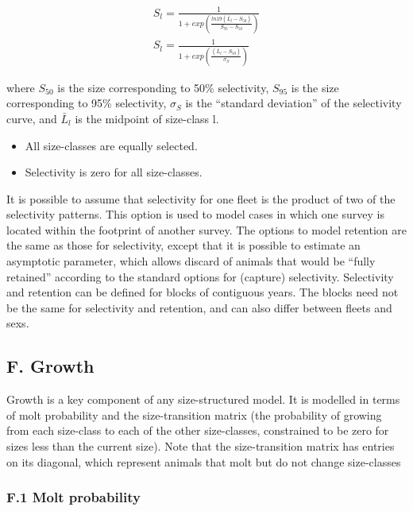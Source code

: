 \documentclass[]{article}
\providecommand{\tightlist}{%
  \setlength{\itemsep}{0pt}\setlength{\parskip}{0pt}}
\begin{document}
\begin{align}
   S_{l} = \frac {1} {1 + exp(\frac{ln19(\bar{L}_l - S_{50})}{S_{95}-S_{50}})} \\[2ex]
   S_{l} = \frac {1} {1 + exp(\frac{(\bar{L}_l - S_{50})}{\sigma_{S}})} 
  \end{align}

where \(S_{50}\) is the size corresponding to 50\% selectivity,
\(S_{95}\) is the size corresponding to 95\% selectivity, \(\sigma_{S}\)
is the ``standard deviation'' of the selectivity curve, and
\(\bar{L}_l\) is the midpoint of size-class l.

\begin{itemize}
\tightlist
\item
  All size-classes are equally selected.
\item
  Selectivity is zero for all size-classes.
\end{itemize}

It is possible to assume that selectivity for one fleet is the product
of two of the selectivity patterns. This option is used to model cases
in which one survey is located within the footprint of another survey.
The options to model retention are the same as those for selectivity,
except that it is possible to estimate an asymptotic parameter, which
allows discard of animals that would be ``fully retained'' according to
the standard options for (capture) selectivity. Selectivity and
retention can be defined for blocks of contiguous years. The blocks need
not be the same for selectivity and retention, and can also differ
between fleets and sexs.

\hypertarget{f.-growth}{%
\subsection{F. Growth}\label{f.-growth}}

Growth is a key component of any size-structured model. It is modelled
in terms of molt probability and the size-transition matrix (the
probability of growing from each size-class to each of the other
size-classes, constrained to be zero for sizes less than the current
size). Note that the size-transition matrix has entries on its diagonal,
which represent animals that molt but do not change size-classes

\hypertarget{f.1-molt-probability}{%
\subsubsection{F.1 Molt probability}\label{f.1-molt-probability}}
\end{document}
